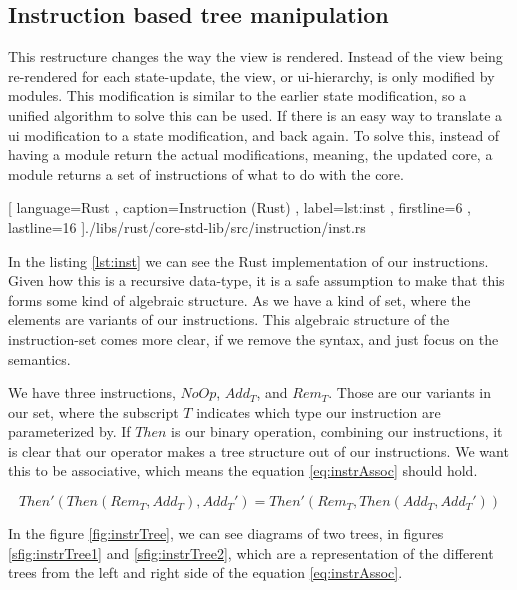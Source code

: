\subsection{Instruction based tree manipulation}

This restructure changes the way the view is rendered. Instead of the view being
re-rendered for each state-update, the view, or \gls*{ui}-hierarchy, is only
modified by modules. This modification is similar to the earlier state
modification, so a unified algorithm to solve this can be used. If there is an
easy way to translate a \gls*{ui} modification to a state modification, and back
again. To solve this, instead of having a module return the actual
modifications, meaning, the updated core, a module returns a set of instructions
of what to do with the core.

\begin{code}[H]
  
   [ language=Rust
   , caption={Instruction (Rust)}
   , label=lst:inst
   , firstline=6
   , lastline=16
   ]{./libs/rust/core-std-lib/src/instruction/inst.rs}
\end{code}

In the listing \ref{lst:inst} we can see the Rust implementation of our
instructions. Given how this is a recursive data-type, it is a safe assumption
to make that this forms some kind of algebraic structure. As we have a kind of
set, where the elements are variants of our instructions. This algebraic
structure of the instruction-set comes more clear, if we remove the syntax, and
just focus on the semantics.

We have three instructions, $NoOp$, $Add_T$, and $Rem_T$. Those are our variants
in our set, where the subscript $T$ indicates which type our instruction are
parameterized by. If $Then$ is our binary operation, combining our instructions,
it is clear that our operator makes a tree structure out of our instructions. We
want this to be associative, which means the equation \ref{eq:instrAssoc} should
hold.

\begin{equation} \label{eq:instrAssoc}
  Then'(Then(Rem_T, Add_T), Add_T') = Then'(Rem_T, Then(Add_T, Add_T'))
\end{equation}

In the figure \ref{fig:instrTree}, we can see diagrams of two trees,
in figures \ref{sfig:instrTree1} and \ref{sfig:instrTree2}, which are a
representation of the different trees from the left and right side of the
equation \ref{eq:instrAssoc}.

